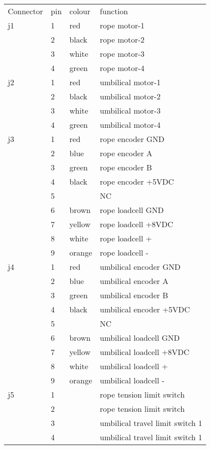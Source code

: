\begin{table}
\begin{center}
\begin{tabular}{|l|l|l|l|} 
\hline
Connector & pin & colour& function \\
j1 & 1 & red   & rope motor-1 \\
   & 2 & black & rope motor-2 \\
   & 3 & white & rope motor-3 \\
   & 4 & green & rope motor-4 \\
\hline
j2 & 1 & red   & umbilical motor-1 \\
   & 2 & black & umbilical motor-2 \\
   & 3 & white & umbilical motor-3 \\
   & 4 & green & umbilical motor-4 \\
\hline
j3 & 1 & red   & rope encoder GND \\
   & 2 & blue  & rope encoder A \\
   & 3 & green & rope encoder B \\
   & 4 & black & rope encoder +5VDC \\
   & 5 &       & NC \\
   & 6 & brown  & rope loadcell GND \\
   & 7 & yellow & rope loadcell +8VDC \\
   & 8 & white  & rope loadcell + \\
   & 9 & orange & rope loadcell - \\
\hline
j4 & 1 & red    & umbilical encoder GND \\
   & 2 & blue   & umbilical encoder A \\
   & 3 & green  & umbilical encoder B \\
   & 4 & black  & umbilical encoder +5VDC \\
   & 5 &        & NC \\
   & 6 & brown  & umbilical loadcell GND \\
   & 7 & yellow & umbilical loadcell +8VDC \\
   & 8 & white  & umbilical loadcell + \\
   & 9 & orange & umbilical loadcell - \\
\hline
j5 & 1 &        & rope tension limit switch \\
   & 2 &        & rope tension limit switch \\
   & 3 &        & umbilical travel limit switch 1\\
   & 4 &        & umbilical travel limit switch 1\\

\end{tabular}
\end{center}
\end{table}
